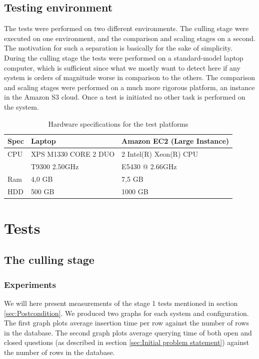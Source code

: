 \section{Testing environment}
The tests were performed on two different environments. The culling stage were executed on one environment, and the comparison and scaling stages on a second. The motivation for such a separation is basically for the sake of simplicity. During the culling stage the tests were performed on a standard-model laptop computer, which is sufficient since what we mostly want to detect here if any system is orders of magnitude worse in comparison to the others. The comparison and scaling stages were performed on a much more rigorous platform, an instance in the Amazon S3 cloud. Once a test is initiated no other task is performed on the system.

\begin{table} [ht]
\caption{Hardware specifications for the test platforms}
\centering
\begin{tabular}{l|l|l}
\hline\hline
Spec     &  Laptop                  &  Amazon EC2 (Large Instance)  \\
\hline
CPU      &  XPS M1330 CORE 2 DUO    &  2 Intel(R) Xeon(R) CPU       \\ 
         &  T9300 2.50GHz           &  E5430 @ 2.66GHz              \\  
Ram      &  4,0 GB                  &  7,5 GB                       \\                
HDD      &  500 GB                  &  1000 GB                      \\  
\hline
\end{tabular}
\end{table}

\chapter{Tests}
\section{The culling stage}
\subsection{Experiments}
We will here present measurements of the stage 1 tests mentioned in section \ref{sec:Postcondition}. We produced two graphs for each system and configuration. The first graph plots average insertion time per row against the number of rows in the database. The second graph plots average querying time of both open and closed questions (as described in section \ref{sec:Initial problem statement}) against the number of rows in the database.

